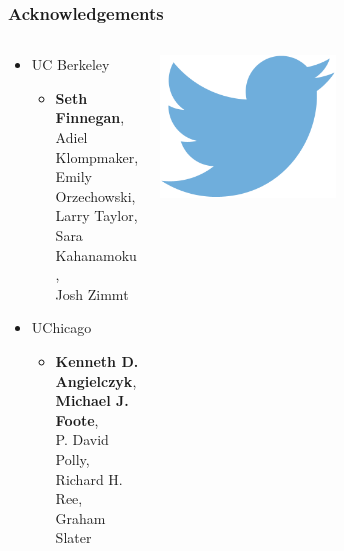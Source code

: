 \documentclass{beamer}
\begin{document}
\begin{frame}
  \frametitle{Acknowledgements}
  \begin{columns}
    \begin{column}{0.5\textwidth}
      \begin{itemize}
        \item UC Berkeley
          \begin{itemize}
            \item \textbf{Seth Finnegan}, \\Adiel Klompmaker, \\Emily Orzechowski, \\Larry Taylor, \\Sara Kahanamoku, \\Josh Zimmt
          \end{itemize}
        \item UChicago
          \begin{itemize}
            \item \textbf{Kenneth D. Angielczyk}, \\\textbf{Michael J. Foote}, \\P. David Polly, \\Richard H. Ree, \\Graham Slater
          \end{itemize}
      \end{itemize}
    \end{column}
    \begin{column}{0.5\textwidth}
      \begin{center}
        \includegraphics[height=0.2\textheight,width=0.5\textwidth,keepaspectratio=true]{figure/twitter} 


\end{center}
\end{column}
\end{columns}
\end{frame}
\end{document}
